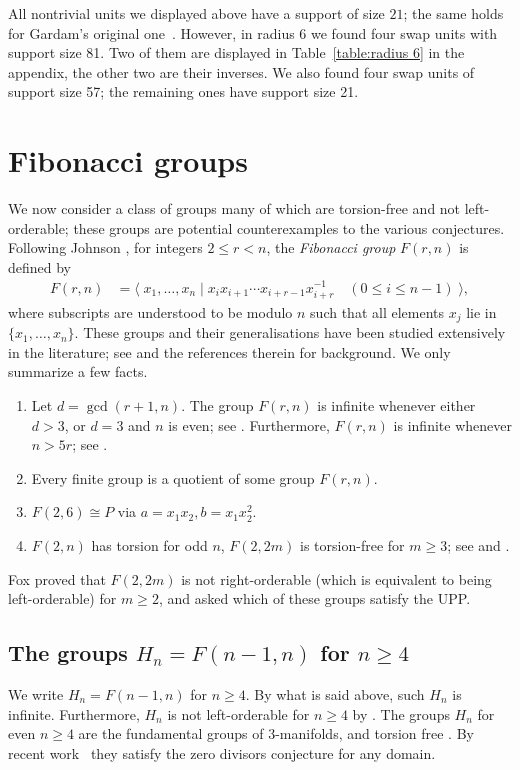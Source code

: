 \documentclass[11pt]{amsart}
\theoremstyle{mythm}
\theoremstyle{mydef}
\theoremstyle{myrem}
\numberwithin{equation}{section}
\renewcommand{\leq}{\leqslant}
\renewcommand{\geq}{\geqslant}
\begin{document}
All nontrivial units  we displayed  above have a  support of size $21$; the same holds for   Gardam's original one~\cite{G}. However, in radius 6 we found   four swap units with support size 81. Two of them   are displayed  in Table~\ref{table:radius 6} in the appendix, the other two are their  inverses. We also found four swap units of support size 57; the remaining ones have support size 21.
  
 
  
  
 
\section{Fibonacci groups}\label{sec_fib}
\noindent We now consider a class of groups many of which are   torsion-free  and not left-orderable;  these groups are potential counterexamples to  the various conjectures. Following Johnson \cite[p.\ 74]{johnson},  for  integers $2\leq r<n$,  the \emph{Fibonacci group} $F(r,n)$  is defined by 
\begin{align}\label{eq_fib}F(r,n)&=\langle\; x_1,\ldots,x_n \mid x_ix_{i+1}\cdots x_{i+r-1}x_{i+r}^{-1}\quad (0\leq i\leq n-1)\;\rangle, 
\end{align}
where subscripts are understood to be modulo $n$ such that all elements $x_j$ lie in  $\{x_1,\ldots,x_n\}$.  These groups and their generalisations   have been studied extensively in the literature; see \cite{kim,thomas} and the references therein for background. We only summarize a few facts.

\begin{enumerate}
	\item   Let $d=\gcd(r+1,n)$. The group $F(r,n)$ is infinite whenever either $d>3$, or $d=3$ and $n$ is even; see \cite{thomas}.  Furthermore,  $F(r,n)$ is infinite whenever $n>5r$;  see \cite[p.\ 76]{johnson}. 
	\item Every finite group is a quotient of some group $F(r,n)$.  
	\item $F(2,6) \cong P$ via $a= x_1 x_2, b= x_1 x_2^2$. 
	\item  $F(2,n)$   has torsion  for odd $n$, $F(2,2m)$ is torsion-free for $m\geq 3$; see  \cite[p.\ 84]{johnson} and \cite[(P4)]{helling}.  
\end{enumerate}
 Fox \cite{fox} proved that $F(2,2m)$ is not right-orderable (which is equivalent to being left-orderable) for $m\geq 2$, and   asked which of these groups satisfy the UPP. 
 
 
 \subsection{The groups $H_n=F(n-1,n)$ for   $n \ge 4$} 
We write $H_n=F(n-1,n)$  for   $n \ge 4$. By what is said above, such $H_n$ is infinite.   Furthermore, $H_n$ is not left-orderable for $n\geq 4$ by  \cite[Lemma 4]{DPT}. The groups $H_n$ for even $n \ge 4$ are the fundamental groups of 3-manifolds, and torsion free \cite[Proposition 2b.ii]{DPT}. By   recent work~\cite{FisherSanchezPeralta2023} they satisfy the zero divisors conjecture for any domain.  
\end{document}
